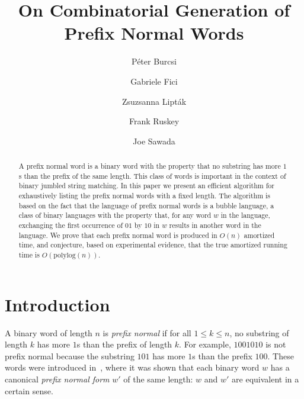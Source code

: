 \documentclass[11pt,a4paper]{llncs}
\def\polylog{\mathrm{polylog}}
\begin{document}
\title{On Combinatorial Generation of Prefix Normal Words}


\author{P\'eter Burcsi \and Gabriele Fici \and Zsuzsanna Lipt\'ak \and Frank Ruskey \and Joe Sawada}



\date{}

\maketitle

\begin{abstract}
A prefix normal word is a binary word with the property that no substring has more $1$s than the prefix of the same length. This class of words is important in the context of binary jumbled string matching. In this paper we present an efficient algorithm for exhaustively listing the prefix normal words with a fixed length. The algorithm is based on the fact that the language of prefix normal words is a bubble language, a class of binary languages with the property that, for any word $w$ in the language, exchanging the first occurrence of $01$ by $10$ in $w$ results in another word in the language. We prove that each prefix normal word is produced in $O(n)$ amortized time, and conjecture, based on experimental evidence, that the true amortized running time is $O(\polylog(n))$. 
\end{abstract}

\section{Introduction}


A binary word of length $n$ is {\em prefix normal} if for all $1 \leq k \leq n$, no substring of length $k$ has more $1$s than the prefix of length $k$. For example, $1001010$ is not prefix normal because the substring $101$ has more $1$s than the prefix $100$. These words were introduced in~\cite{FL11}, where it was shown that each binary word $w$ has a canonical {\em prefix normal form} $w'$ of the same length: $w$ and $w'$ are equivalent in a certain sense. 
\end{document}
